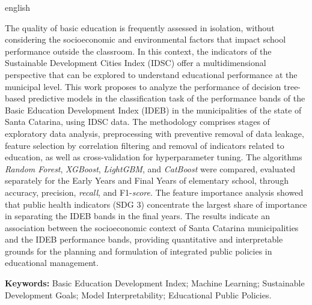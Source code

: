 \setlength{\absparsep}{18pt}

\begin{otherlanguage*}{english}	
\begin{resumo}[ABSTRACT]
	
	The quality of basic education is frequently assessed in isolation, without considering the socioeconomic and environmental factors that impact school performance outside the classroom. In this context, the indicators of the Sustainable Development Cities Index (IDSC) offer a multidimensional perspective that can be explored to understand educational performance at the municipal level. This work proposes to analyze the performance of decision tree-based predictive models in the classification task of the performance bands of the Basic Education Development Index (IDEB) in the municipalities of the state of Santa Catarina, using IDSC data. The methodology comprises stages of exploratory data analysis, preprocessing with preventive removal of data leakage, feature selection by correlation filtering and removal of indicators related to education, as well as cross-validation for hyperparameter tuning. The algorithms \textit{Random Forest}, \textit{XGBoost}, \textit{LightGBM}, and \textit{CatBoost} were compared, evaluated separately for the Early Years and Final Years of elementary school, through accuracy, precision, \textit{recall}, and F1-\textit{score}. The feature importance analysis showed that public health indicators (SDG 3) concentrate the largest share of importance in separating the IDEB bands in the final years. The results indicate an association between the socioeconomic context of Santa Catarina municipalities and the IDEB performance bands, providing quantitative and interpretable grounds for the planning and formulation of integrated public policies in educational management.
	
	\noindent\textbf{Keywords:} Basic Education Development Index; Machine Learning; Sustainable Development Goals; Model Interpretability; Educational Public Policies.
\end{resumo}
\end{otherlanguage*}